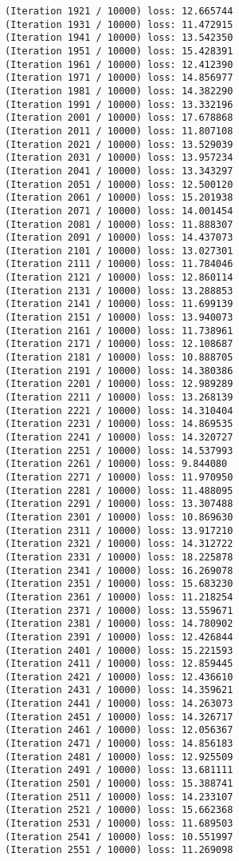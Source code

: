 \documentclass[11pt]{article}
\begin{document}
\begin{Verbatim}[commandchars=\\\{\}]
(Iteration 1921 / 10000) loss: 12.665744
(Iteration 1931 / 10000) loss: 11.472915
(Iteration 1941 / 10000) loss: 13.542350
(Iteration 1951 / 10000) loss: 15.428391
(Iteration 1961 / 10000) loss: 12.412390
(Iteration 1971 / 10000) loss: 14.856977
(Iteration 1981 / 10000) loss: 14.382290
(Iteration 1991 / 10000) loss: 13.332196
(Iteration 2001 / 10000) loss: 17.678868
(Iteration 2011 / 10000) loss: 11.807108
(Iteration 2021 / 10000) loss: 13.529039
(Iteration 2031 / 10000) loss: 13.957234
(Iteration 2041 / 10000) loss: 13.343297
(Iteration 2051 / 10000) loss: 12.500120
(Iteration 2061 / 10000) loss: 15.201938
(Iteration 2071 / 10000) loss: 14.001454
(Iteration 2081 / 10000) loss: 11.888307
(Iteration 2091 / 10000) loss: 14.437073
(Iteration 2101 / 10000) loss: 13.027301
(Iteration 2111 / 10000) loss: 11.784046
(Iteration 2121 / 10000) loss: 12.860114
(Iteration 2131 / 10000) loss: 13.288853
(Iteration 2141 / 10000) loss: 11.699139
(Iteration 2151 / 10000) loss: 13.940073
(Iteration 2161 / 10000) loss: 11.738961
(Iteration 2171 / 10000) loss: 12.108687
(Iteration 2181 / 10000) loss: 10.888705
(Iteration 2191 / 10000) loss: 14.380386
(Iteration 2201 / 10000) loss: 12.989289
(Iteration 2211 / 10000) loss: 13.268139
(Iteration 2221 / 10000) loss: 14.310404
(Iteration 2231 / 10000) loss: 14.869535
(Iteration 2241 / 10000) loss: 14.320727
(Iteration 2251 / 10000) loss: 14.537993
(Iteration 2261 / 10000) loss: 9.844080
(Iteration 2271 / 10000) loss: 11.970950
(Iteration 2281 / 10000) loss: 11.488095
(Iteration 2291 / 10000) loss: 13.307488
(Iteration 2301 / 10000) loss: 10.869630
(Iteration 2311 / 10000) loss: 13.917210
(Iteration 2321 / 10000) loss: 14.312722
(Iteration 2331 / 10000) loss: 18.225878
(Iteration 2341 / 10000) loss: 16.269078
(Iteration 2351 / 10000) loss: 15.683230
(Iteration 2361 / 10000) loss: 11.218254
(Iteration 2371 / 10000) loss: 13.559671
(Iteration 2381 / 10000) loss: 14.780902
(Iteration 2391 / 10000) loss: 12.426844
(Iteration 2401 / 10000) loss: 15.221593
(Iteration 2411 / 10000) loss: 12.859445
(Iteration 2421 / 10000) loss: 12.436610
(Iteration 2431 / 10000) loss: 14.359621
(Iteration 2441 / 10000) loss: 14.263073
(Iteration 2451 / 10000) loss: 14.326717
(Iteration 2461 / 10000) loss: 12.056367
(Iteration 2471 / 10000) loss: 14.856183
(Iteration 2481 / 10000) loss: 12.925509
(Iteration 2491 / 10000) loss: 13.681111
(Iteration 2501 / 10000) loss: 15.388741
(Iteration 2511 / 10000) loss: 14.233107
(Iteration 2521 / 10000) loss: 15.662368
(Iteration 2531 / 10000) loss: 11.689503
(Iteration 2541 / 10000) loss: 10.551997
(Iteration 2551 / 10000) loss: 11.269098

\end{Verbatim}
\end{document}
